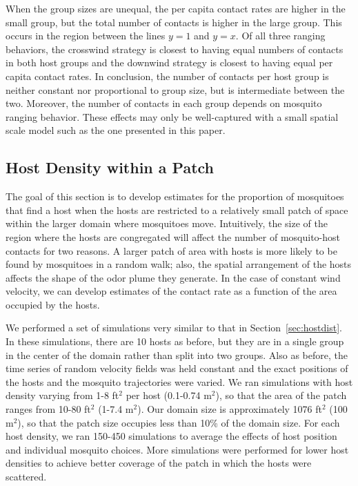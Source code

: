 \documentclass[12pt]{article}
\begin{document}
 When the group sizes are unequal, the per capita contact rates are higher in the small group, but the total number of contacts is higher in the large group. This occurs in the region between the lines $y=1$ and $y=x$. Of all three ranging behaviors, the crosswind strategy is closest to having equal numbers of contacts in both host groups and the downwind strategy is closest to having equal per capita contact rates. In conclusion, the number of contacts per host group is neither constant nor proportional to group size, but is intermediate between the two. Moreover, the number of contacts in each group depends on mosquito ranging behavior. These effects may only be well-captured with a small spatial scale model such as the one presented in this paper.


\subsection{Host Density within a Patch}\label{sec:res:hostdens}
The goal of this section is to develop estimates for the proportion of mosquitoes that find a host when the hosts are restricted to a relatively small patch of space within the larger domain where mosquitoes move.  Intuitively, the size of the region where the hosts are congregated will affect the number of mosquito-host contacts for two reasons.  A larger patch of area with hosts is more likely to be found by mosquitoes in a random walk; also, the spatial arrangement of the hosts affects the shape of the odor plume they generate. In the case of constant wind velocity, we can develop estimates of the contact rate as a function of the area occupied by the hosts.

We performed a set of simulations very similar to that in Section~\ref{sec:hostdist}. In these simulations, there are 10 hosts as before, but they are in a single group in the center of the domain rather than split into two groups. Also as before, the time series of random velocity fields was held constant and the exact positions of the hosts and the mosquito trajectories were varied. We ran simulations with host density varying from 1-8 ft$^2$ per host (0.1-0.74 m$^2$), so that the area of the patch ranges from 10-80 ft$^2$ (1-7.4 m$^2$). Our domain size is approximately 1076 ft$^2$ (100 m$^2$), so that the patch size occupies less than 10\% of the domain size. For each host density, we ran 150-450 simulations to average the effects of host position and individual mosquito choices. More simulations were performed for lower host densities to achieve better coverage of the patch in which the hosts were scattered.
\end{document}
